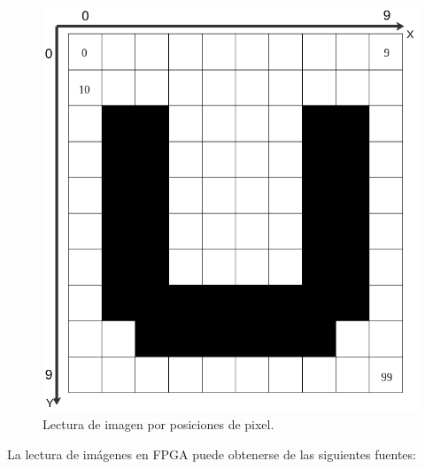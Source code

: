 \documentclass[twoside,spanish,ESP,MSc]{plantillaLabUPV}
\theoremstyle{definition}
\begin{document}
\begin{figure}[h]
	\centering
	\includegraphics[scale=0.3]{edrawimas/leeimag}
	\caption{Lectura de imagen por posiciones de pixel. 
	\label{u}}
\end{figure}

La lectura de imágenes en FPGA puede obtenerse de las siguientes fuentes:
\end{document}
